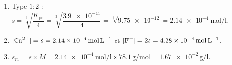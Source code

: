 \documentclass[11pt,a4paper]{article}
\begin{document}
\begin{corrige}
\begin{enumerate}[label=\alph*)]
  \item Type $1{:}2$ : $s=\sqrt[3]{\dfrac{K_{\mathrm{ps}}}{4}}=\sqrt[3]{\dfrac{\num{3.9e-11}}{4}}
        =\sqrt[3]{\num{9.75e-12}}=\qty{2.14e-4}{\mole\per\litre}$.
  \item $[\ce{Ca^{2+}}]=s=\qty{2.14e-4}{\mole\per\litre}$ et
        $[\ce{F-}]=2s=\qty{4.28e-4}{\mole\per\litre}$.
  \item $s_m=s\times M=\qty{2.14e-4}{\mole\per\litre}\times\qty{78.1}{\gram\per\mole}
        =\qty{1.67e-2}{\gram\per\litre}$.
\end{enumerate}
\end{corrige}
\end{document}
